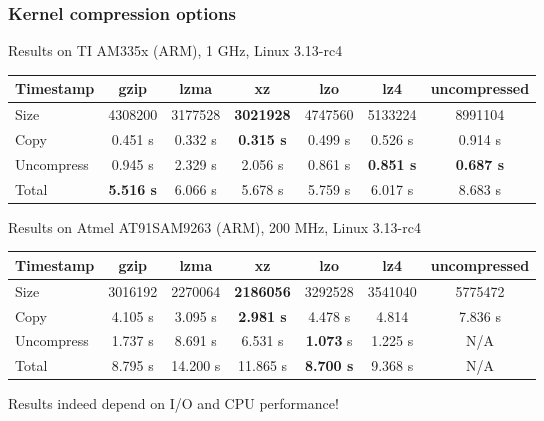 \begin{frame}
\frametitle{Kernel compression options}
Results on TI AM335x (ARM), 1 GHz, Linux 3.13-rc4
{\scriptsize
\begin{tabular}{| l || c | c | c | c | c | c |}
\hline
Timestamp & gzip & lzma & xz & lzo & lz4 & uncompressed \\
\hline
Size & 4308200 & 3177528 & {\bf 3021928} & 4747560 & 5133224 & 8991104 \\
Copy & 0.451 s & 0.332 s & {\bf 0.315 s} & 0.499 s & 0.526 s & 0.914 s \\
Uncompress & 0.945 s & 2.329 s & 2.056 s & 0.861 s & {\bf 0.851 s} & {\bf 0.687 s} \\
Total & {\bf 5.516 s} & 6.066 s & 5.678 s & 5.759 s & 6.017 s & 8.683 s \\
\hline
\end{tabular}
}
\vfill{}
Results on Atmel AT91SAM9263 (ARM), 200 MHz, Linux 3.13-rc4
{\scriptsize
\begin{tabular}{| l || c | c | c | c | c | c |}
\hline
Timestamp & gzip & lzma & xz & lzo & lz4 & uncompressed \\
\hline
Size & 3016192 & 2270064 & {\bf 2186056} & 3292528 & 3541040 & 5775472 \\
Copy & 4.105 s & 3.095 s & {\bf 2.981 s} & 4.478 s & 4.814 & 7.836 s \\
Uncompress & 1.737 s & 8.691 s & 6.531 s & {\bf 1.073} s & 1.225 s & N/A \\
Total & 8.795 s & 14.200 s & 11.865 s & {\bf 8.700 s} & 9.368 s & N/A \\
\hline
\end{tabular}
}
\newline\newline
Results indeed depend on I/O and CPU performance!
\end{frame}

